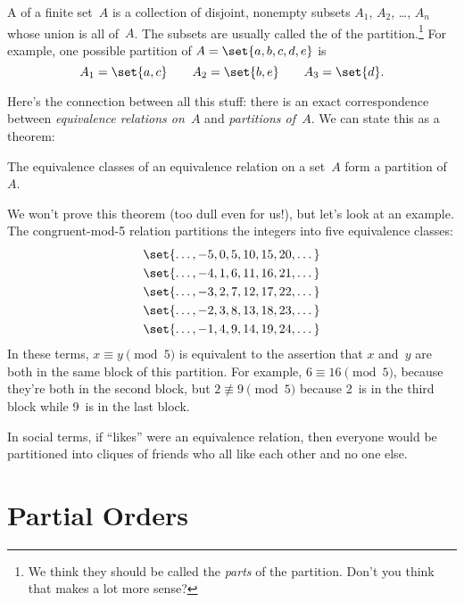 \begin{definition}\label{def:partition}

A  of a finite set~$A$ is a collection of disjoint,
nonempty subsets $A_1$, $A_2$, \dots, $A_n$ whose union is all of~$A$.
The subsets are usually called the  of the
partition.\footnote{We think they should be called the \emph{parts} of
  the partition. Don't you think that makes a lot more sense?}  For
example, one possible partition of $A = \set{a, b, c, d, e}$ is
\begin{equation*}
    A_1 = \set{a, c}
    \qquad
    A_2 = \set{b, e}
    \qquad
    A_3 = \set{d}.
\end{equation*}
\end{definition}

Here's the connection between all this stuff: there is an exact
correspondence  between \emph{equivalence relations on~$A$} and
\emph{partitions of~$A$}.  We can state this as a theorem:

\begin{theorem}
The equivalence classes of an equivalence relation on a set~$A$ form a
partition of~$A$.
\end{theorem}

We won't prove this theorem (too dull even for us!), but let's look at
an example.  The congruent-mod-5 relation partitions the integers into
five equivalence classes:
\begin{gather*}
    \set{ \dots, -5, 0, 5, 10, 15, 20, \dots } \\
    \set{ \dots, -4, 1, 6, 11, 16, 21, \dots } \\
    \set{ \dots, -3, 2, 7, 12, 17, 22, \dots } \\
    \set{ \dots, -2, 3, 8, 13, 18, 23, \dots } \\
    \set{ \dots, -1, 4, 9, 14, 19, 24, \dots } \\
\end{gather*}
In these terms, $x \equiv y \pmod{5}$ is equivalent to the assertion
that $x$ and~$y$ are both in the same block of this partition.  For
example, $6 \equiv 16 \pmod{5}$, because they're both in the second
block, but $2 \nequiv 9 \pmod{5}$ because 2~is in the third block
while 9~is in the last block.

In social terms, if ``likes'' were an equivalence relation, then
everyone would be partitioned into cliques of friends who all like
each other and no one else.

\section{Partial Orders}\label{sec:partial_orders}

